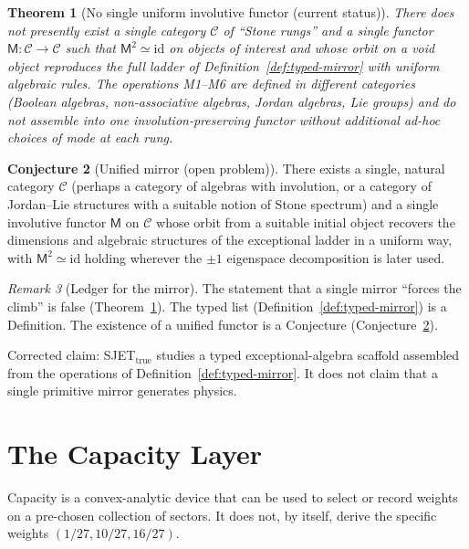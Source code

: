 \documentclass[11pt]{article}
\theoremstyle{plain}
\newtheorem{theorem}{Theorem}[section]
\theoremstyle{definition}
\newtheorem{conjecture}[theorem]{Conjecture}
\theoremstyle{remark}
\newtheorem{remark}[theorem]{Remark}
\numberwithin{equation}{section}
\newcommand{\Mirror}{\mathsf{M}}
\begin{document}
\begin{theorem}[No single uniform involutive functor (current status)]\label{thm:no-single-mirror}
There does not presently exist a single category $\mathcal{C}$ of ``Stone rungs'' and a single functor $\Mirror:\mathcal{C}\to\mathcal{C}$ such that $\Mirror^2\simeq\mathrm{id}$ on objects of interest and whose orbit on a void object reproduces the full ladder of Definition~\ref{def:typed-mirror} with uniform algebraic rules. The operations M1--M6 are defined in different categories (Boolean algebras, non-associative algebras, Jordan algebras, Lie groups) and do not assemble into one involution-preserving functor without additional ad-hoc choices of mode at each rung.
\end{theorem}

\begin{conjecture}[Unified mirror (open problem)]\label{conj:unified-mirror}
There exists a single, natural category $\mathcal{C}$ (perhaps a category of algebras with involution, or a category of Jordan--Lie structures with a suitable notion of Stone spectrum) and a single involutive functor $\Mirror$ on $\mathcal{C}$ whose orbit from a suitable initial object recovers the dimensions and algebraic structures of the exceptional ladder in a uniform way, with $\Mirror^2\simeq\mathrm{id}$ holding wherever the $\pm 1$ eigenspace decomposition is later used.
\end{conjecture}

\begin{remark}[Ledger for the mirror]
The statement that a single mirror ``forces the climb'' is false (Theorem~\ref{thm:no-single-mirror}). The typed list (Definition~\ref{def:typed-mirror}) is a Definition. The existence of a unified functor is a Conjecture (Conjecture~\ref{conj:unified-mirror}).
\end{remark}

Corrected claim: SJET$_{\mathrm{true}}$ studies a typed exceptional-algebra scaffold assembled from the operations of Definition~\ref{def:typed-mirror}. It does not claim that a single primitive mirror generates physics.

\section{The Capacity Layer}
\label{sec:capacity}

Capacity is a convex-analytic device that can be used to select or record weights on a pre-chosen collection of sectors. It does not, by itself, derive the specific weights $(1/27,10/27,16/27)$.
\end{document}
